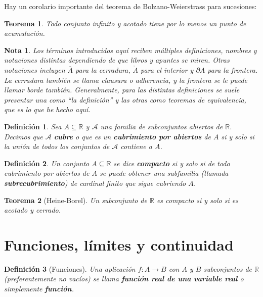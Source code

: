 \documentclass{article}
\newtheorem{theorem}{Teorema}
\newtheorem{define}{Definición}
\newtheorem{note}{Nota}
\newcommand{\reales}{\mathbb{R}}
\begin{document}
Hay un corolario importante del teorema de Bolzano-Weierstrass para sucesiones:

\begin{theorem}
	Todo conjunto infinito y acotado tiene por lo menos un punto de acumulación.
\end{theorem}

\begin{note}
	Los términos introducidos aquí reciben múltiples definiciones, nombres y notaciones distintas dependiendo de que libros y apuntes se miren. Otras notaciones incluyen $\overline{A}$ para la cerradura, $\mathring{A}$ para el interior y $\partial A$ para la frontera. La cerradura también se llama clausura o adherencia, y la frontera se le puede llamar borde también. Generalmente, para las distintas definiciones se suele presentar una como ``la definición'' y las otras como teoremas de equivalencia, que es lo que he hecho aquí.
\end{note}

\begin{define}
	Sea $A \subseteq \reales$ y $\mathcal{A}$ una familia de subconjuntos abiertos de $\reales$. Decimos que $\mathcal{A}$ \textbf{cubre} o que es un \textbf{cubrimiento por abiertos} de $A$ si y solo si la unión de todos los conjuntos de $\mathcal{A}$ contiene a $A$.
\end{define}

\begin{define}
	Un conjunto $A \subseteq \reales$ se dice \textbf{compacto} si y solo si de todo cubrimiento por abiertos de $A$ se puede obtener una subfamilia (llamada \textbf{subrecubrimiento}) de cardinal finito que sigue cubriendo $A$.
\end{define}

\begin{theorem}[Heine-Borel]
	Un subconjunto de $\reales$ es compacto si y solo si es acotado y cerrado.
\end{theorem}





\section{Funciones, límites y continuidad}
\begin{define}[Funciones]
	Una aplicación $f:A \rightarrow B$ con $A$ y $B$ subconjuntos de $\reales$ (preferentemente no vacíos) se llama \textbf{función real de una variable real} o simplemente \textbf{función}.
\end{define}
\end{document}

